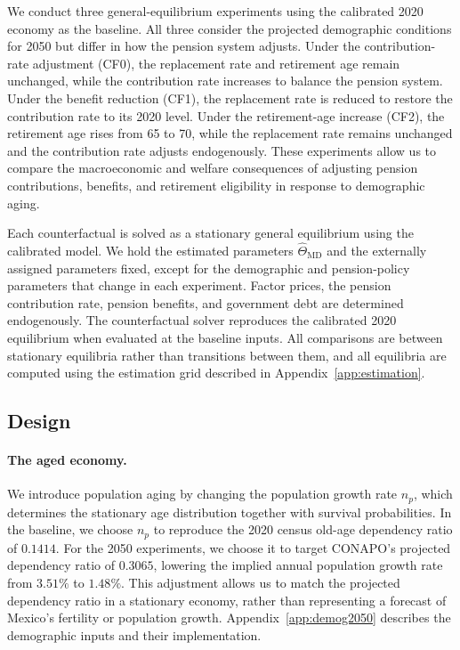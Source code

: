 \documentclass[12pt,a4paper]{article}
\begin{document}
We conduct three general-equilibrium experiments using the calibrated 2020 economy as the baseline. All three consider the projected demographic conditions for 2050 but differ in how the pension system adjusts. Under the contribution-rate adjustment (CF0), the replacement rate and retirement age remain unchanged, while the contribution rate increases to balance the pension system. Under the benefit reduction (CF1), the replacement rate is reduced to restore the contribution rate to its 2020 level. Under the retirement-age increase (CF2), the retirement age rises from 65 to 70, while the replacement rate remains unchanged and the contribution rate adjusts endogenously. These experiments allow us to compare the macroeconomic and welfare consequences of adjusting pension contributions, benefits, and retirement eligibility in response to demographic aging.

Each counterfactual is solved as a stationary general equilibrium using the calibrated model. We hold the estimated parameters $\widehat\Theta_{\mathrm{MD}}$ and the externally assigned parameters fixed, except for the demographic and pension-policy parameters that change in each experiment. Factor prices, the pension contribution rate, pension benefits, and government debt are determined endogenously. The counterfactual solver reproduces the calibrated 2020 equilibrium when evaluated at the baseline inputs. All comparisons are between stationary equilibria rather than transitions between them, and all equilibria are computed using the estimation grid described in Appendix~\ref{app:estimation}.


\subsection{Design}
\label{subsec:cf_design}

\paragraph{The aged economy.}
We introduce population aging by changing the population growth rate $n_p$, which determines the stationary age distribution together with survival probabilities. In the baseline, we choose $n_p$ to reproduce the 2020 census old-age dependency ratio of $0.1414$. For the 2050 experiments, we choose it to target CONAPO's projected dependency ratio of $0.3065$, lowering the implied annual population growth rate from $3.51\%$ to $1.48\%$. This adjustment allows us to match the projected dependency ratio in a stationary economy, rather than representing a forecast of Mexico's fertility or population growth. Appendix~\ref{app:demog2050} describes the demographic inputs and their implementation.
\end{document}
